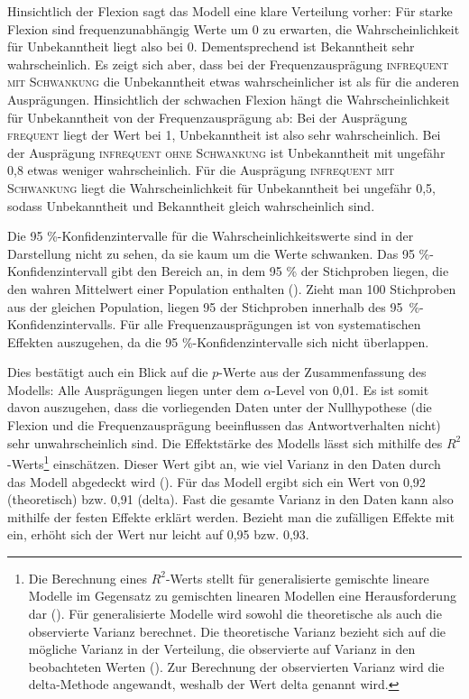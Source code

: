 \begin{sloppypar}
Hinsichtlich der Flexion sagt das Modell eine klare Verteilung vorher: Für starke Flexion sind frequenzunabhängig Werte um 0 zu erwarten, die Wahrscheinlichkeit für Unbekanntheit liegt also bei 0. Dementsprechend ist Bekanntheit sehr wahrscheinlich. Es zeigt sich aber, dass bei der Frequenzausprägung \textsc{infrequent mit Schwankung} die Unbekanntheit etwas wahrscheinlicher ist als für die anderen Ausprägungen. Hinsichtlich der schwachen Flexion hängt die Wahrscheinlichkeit für Unbekanntheit von der Frequenzausprägung ab: Bei der Ausprägung \textsc{frequent} liegt der Wert bei 1, Unbekanntheit ist also sehr wahrscheinlich. Bei der Ausprägung \textsc{infrequent ohne Schwankung} ist Unbekanntheit mit ungefähr 0,8 etwas weniger wahrscheinlich. Für die Ausprägung \textsc{infrequent mit Schwankung} liegt die Wahrscheinlichkeit für Unbekanntheit bei ungefähr 0,5, sodass Unbekanntheit und Bekanntheit gleich wahrscheinlich sind. 
\end{sloppypar}

Die 95 \%-Konfidenzintervalle für die Wahrscheinlichkeitswerte sind in der Darstellung nicht zu sehen, da sie kaum um die Werte schwanken. Das 95 \%-Konfidenzintervall gibt den Bereich an, in dem 95 \% der Stichproben liegen, die den wahren Mittelwert einer Population enthalten (\cite[45]{Field.2012}). Zieht man 100 Stichproben aus der gleichen Population, liegen 95 der Stichproben innerhalb des 95~\%-Konfidenzintervalls. Für alle Frequenzausprägungen ist von systematischen Effekten auszugehen, da die 95 \%-Konfidenzintervalle sich nicht überlappen.



Dies bestätigt auch ein Blick auf die $p$-Werte aus der Zusammenfassung des Modells: Alle Ausprägungen liegen unter dem $\alpha$-Level von 0,01. Es ist somit davon auszugehen, dass die vorliegenden Daten unter der Nullhypothese (die Flexion und die Frequenzausprägung beeinflussen das Antwortverhalten nicht) sehr unwahrscheinlich sind. Die Effektstärke des Modells lässt sich mithilfe des $R^2$-Werts\footnote{Die Berechnung eines $R^2$-Werts stellt für generalisierte gemischte lineare Modelle im Gegensatz zu gemischten linearen Modellen eine Herausforderung dar (\cite[1--2]{Nakagawa.2017}). Für generalisierte Modelle wird sowohl die theoretische als auch die observierte Varianz berechnet. Die theoretische Varianz bezieht sich auf die mögliche Varianz in der Verteilung, die observierte auf Varianz in den beobachteten Werten (\cite[4--6]{Nakagawa.2017}). Zur Berechnung der observierten Varianz wird die delta-Methode angewandt, weshalb der Wert delta genannt wird.} einschätzen. Dieser Wert gibt an, wie viel Varianz in den Daten durch das Modell abgedeckt wird (\cite[89--90]{Winter.2020}). Für das Modell ergibt sich ein Wert von 0,92  (theoretisch) bzw. 0,91 (delta). Fast die gesamte Varianz in den Daten kann also mithilfe der festen Effekte erklärt werden. Bezieht man die zufälligen Effekte mit ein, erhöht sich der Wert nur leicht auf 0,95 bzw. 0,93.

